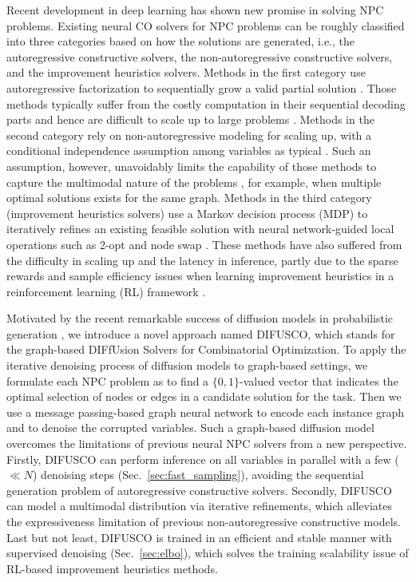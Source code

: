 \documentclass{article}
\theoremstyle{plain}
\theoremstyle{definition}
\theoremstyle{remark}
\newcommand{\method}{DIFUSCO}
\begin{document}
Recent development in deep learning has shown new promise in solving NPC problems.
Existing neural CO solvers for NPC problems
can be roughly classified into three categories based on how the solutions are generated, i.e., the autoregressive constructive solvers, the
non-autoregressive constructive solvers, and the improvement heuristics solvers. %
Methods in the first category use autoregressive factorization to sequentially grow a valid partial solution \citep{bello2016neural,19iclr-am}.
Those methods typically suffer from the costly computation in their sequential decoding parts and hence are difficult to scale up to large problems \citep{fu2021generalize}. Methods in the second category rely on non-autoregressive modeling for scaling up, with a conditional independence assumption among variables as typical
\citep{joshi2019efficient,karalias2020erdos,qiudimes}.  Such an assumption, however, unavoidably limits the capability of those methods to capture  %
the multimodal nature of the problems  %
\citep{khalil2017learning,gu2018non}, for example, when multiple optimal solutions exists for the same graph.
Methods in the third category (improvement heuristics solvers)
use a Markov decision process (MDP) to iteratively refines an existing feasible solution with neural network-guided local operations such as 2-opt \citep{lin1973effective,andrade2012fast} and node swap \citep{chen2019learning,wu2021learning}. These methods %
have also suffered from the difficulty in scaling up and the latency in inference, partly due to the sparse rewards and sample efficiency issues when learning improvement heuristics in a reinforcement learning (RL) framework \citep{wu2021learning,ma2021learning}. %


Motivated by the recent remarkable success of diffusion models in probabilistic generation \citep{song2019generative,ho2020denoising,rombach2022high,yuscaling,saharia2022photorealistic}, we introduce a novel approach named \method, which stands for the graph-based DIFfUsion Solvers for Combinatorial Optimization.
To apply the iterative denoising process of diffusion models to graph-based settings, we formulate each NPC problem %
as to find a $\{0,1\}$-valued vector that indicates the optimal selection of nodes or edges in a candidate solution for the task. Then we use a message passing-based graph neural network \citep{kipf2016semi,hamilton2017inductive,gilmer2017neural,velivckovic2018graph} to encode each instance graph and to denoise the corrupted variables. Such a graph-based diffusion model overcomes the limitations of previous neural NPC solvers from a new perspective. Firstly, \method{} can perform inference on all variables in parallel with a few ($\ll N$) denoising steps (Sec.~\ref{sec:fast_sampling}), avoiding the sequential generation problem of autoregressive constructive solvers. Secondly, \method{} can model a multimodal distribution via iterative refinements, which alleviates the expressiveness limitation of previous non-autoregressive constructive models. Last but not least, \method{} is trained in an efficient and stable manner with supervised denoising (Sec.~\ref{sec:elbo}), which solves the training scalability issue of RL-based improvement heuristics methods.
\end{document}
